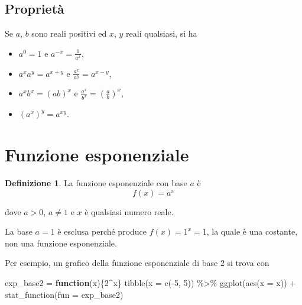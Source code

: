 \documentclass[
  11pt,
]{krantz}
\makeatletter
\newenvironment{Shaded}{\begin{snugshade}}{\end{snugshade}}
\newcommand{\AttributeTok}[1]{\textcolor[rgb]{0.61,0.61,0.61}{#1}}
\newcommand{\ControlFlowTok}[1]{\textcolor[rgb]{0.27,0.27,0.27}{\textbf{#1}}}
\newcommand{\DecValTok}[1]{\textcolor[rgb]{0.06,0.06,0.06}{#1}}
\newcommand{\FunctionTok}[1]{\textcolor[rgb]{0,0,0}{#1}}
\newcommand{\NormalTok}[1]{#1}
\newcommand{\OtherTok}[1]{\textcolor[rgb]{0.37,0.37,0.37}{#1}}
\newcommand{\SpecialCharTok}[1]{\textcolor[rgb]{0,0,0}{#1}}
\providecommand{\tightlist}{%
  \setlength{\itemsep}{0pt}\setlength{\parskip}{0pt}}
\newenvironment{kframe}{%
\medskip{}
\setlength{\fboxsep}{.8em}
 \def\at@end@of@kframe{}%
 \ifinner\ifhmode%
  \def\at@end@of@kframe{\end{minipage}}%
  \begin{minipage}{\columnwidth}%
 \fi\fi%
 \def\FrameCommand##1{\hskip\@totalleftmargin \hskip-\fboxsep
 \colorbox{shadecolor}{##1}\hskip-\fboxsep
     \hskip-\linewidth \hskip-\@totalleftmargin \hskip\columnwidth}%
 \MakeFramed {\advance\hsize-\width
   \@totalleftmargin\z@ \linewidth\hsize
   \@setminipage}}%
 {\par\unskip\endMakeFramed%
 \at@end@of@kframe}
\renewenvironment{Shaded}{\begin{kframe}}{\end{kframe}}
\theoremstyle{definition}
\newtheorem{definition}{Definizione}[chapter]
\theoremstyle{definition}
\theoremstyle{definition}
\theoremstyle{definition}
\theoremstyle{remark}
\makeatother
\begin{document}
\hypertarget{proprietuxe0}{%
\subsection*{Proprietà}\label{proprietuxe0}}


Se \(a\), \(b\) sono reali positivi ed \(x\), \(y\) reali qualsiasi, si ha

\begin{itemize}
\tightlist
\item
  \(a^0 = 1\) e \(a^{-x} = \frac{1}{a^x}\),
\item
  \(a^x a^y = a^{x+y}\) e \(\frac{a^x}{a^y} = a^{x-y}\),
\item
  \(a^x b^x = (ab)^{x}\) e \(\frac{a^x}{b^x} = \left(\frac{a}{b}\right)^x\),
\item
  \((a^x)^y = a^{xy}\).
\end{itemize}

\hypertarget{funzione-esponenziale}{%
\section{Funzione esponenziale}\label{funzione-esponenziale}}

\begin{definition}
La funzione esponenziale con base \(a\) è \begin{equation}
f(x) = a^x
\end{equation}

dove \(a > 0\), \(a \neq 1\) e \(x\) è qualsiasi numero reale.
\end{definition}

La base \(a = 1\) è esclusa perché produce \(f(x) = 1^x = 1\), la quale è una costante, non una funzione esponenziale.

Per esempio, un grafico della funzione esponenziale di base 2 si trova con

\begin{Shaded}
\begin{Highlighting}[]
\NormalTok{exp\_base2 }\OtherTok{=} \ControlFlowTok{function}\NormalTok{(x)\{}\DecValTok{2}\SpecialCharTok{\^{}}\NormalTok{x\}}
\FunctionTok{tibble}\NormalTok{(}\AttributeTok{x =} \FunctionTok{c}\NormalTok{(}\SpecialCharTok{{-}}\DecValTok{5}\NormalTok{, }\DecValTok{5}\NormalTok{)) }\SpecialCharTok{\%\textgreater{}\%}
\FunctionTok{ggplot}\NormalTok{(}\FunctionTok{aes}\NormalTok{(}\AttributeTok{x =}\NormalTok{ x)) }\SpecialCharTok{+}
  \FunctionTok{stat\_function}\NormalTok{(}\AttributeTok{fun =}\NormalTok{ exp\_base2)}
\end{Highlighting}
\end{Shaded}
\end{document}
